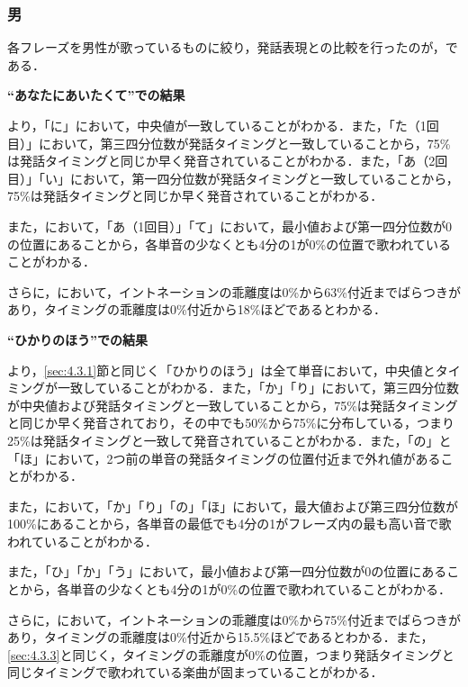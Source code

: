 \subsubsection{男}
各フレーズを男性が歌っているものに絞り，発話表現との比較を行ったのが，である．

\textbf{“あなたにあいたくて”での結果}\par
より，「に」において，中央値が一致していることがわかる．また，「た（1回目）」において，第三四分位数が発話タイミングと一致していることから，75\%は発話タイミングと同じか早く発音されていることがわかる．また，「あ（2回目）」「い」において，第一四分位数が発話タイミングと一致していることから，75\%は発話タイミングと同じか早く発音されていることがわかる．\par
また，において，「あ（1回目）」「て」において，最小値および第一四分位数が0の位置にあることから，各単音の少なくとも4分の1が0\%の位置で歌われていることがわかる．\par
さらに，において，イントネーションの乖離度は0\%から63\%付近までばらつきがあり，タイミングの乖離度は0\%付近から18\%ほどであるとわかる．


\textbf{“ひかりのほう”での結果}\par
より，\ref{sec:4.3.1}節と同じく「ひかりのほう」は全て単音において，中央値とタイミングが一致していることがわかる．また，「か」「り」において，第三四分位数が中央値および発話タイミングと一致していることから，75\%は発話タイミングと同じか早く発音されており，その中でも50\%から75\%に分布している，つまり25\%は発話タイミングと一致して発音されていることがわかる．また，「の」と「ほ」において，2つ前の単音の発話タイミングの位置付近まで外れ値があることがわかる．\par
また，において，「か」「り」「の」「ほ」において，最大値および第三四分位数が100\%にあることから，各単音の最低でも4分の1がフレーズ内の最も高い音で歌われていることがわかる．\par
また，「ひ」「か」「う」において，最小値および第一四分位数が0の位置にあることから，各単音の少なくとも4分の1が0\%の位置で歌われていることがわかる．\par
さらに，において，イントネーションの乖離度は0\%から75\%付近までばらつきがあり，タイミングの乖離度は0\%付近から15.5\%ほどであるとわかる．また，\ref{sec:4.3.3}と同じく，タイミングの乖離度が0\%の位置，つまり発話タイミングと同じタイミングで歌われている楽曲が固まっていることがわかる．


